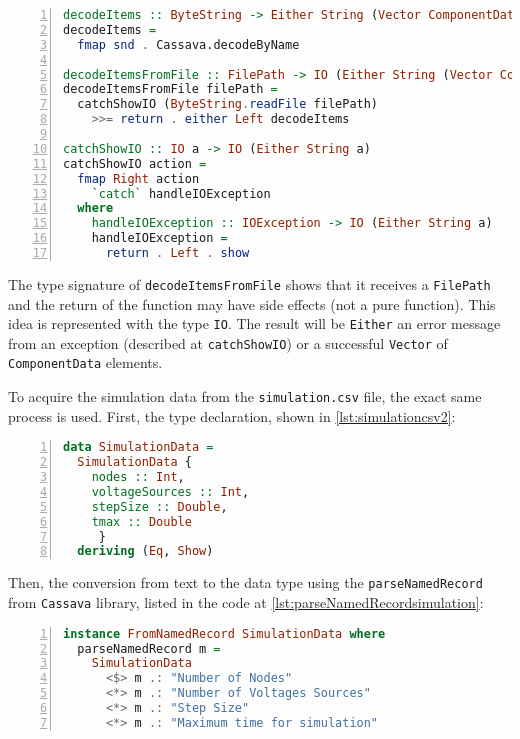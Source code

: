 \begin{lstlisting}[language=Haskell, numbers=left, caption={Decoding a CSV file}, captionpos=b, label={lst:decode}]
decodeItems :: ByteString -> Either String (Vector ComponentData)
decodeItems =
  fmap snd . Cassava.decodeByName

decodeItemsFromFile :: FilePath -> IO (Either String (Vector ComponentData))
decodeItemsFromFile filePath =
  catchShowIO (ByteString.readFile filePath)
    >>= return . either Left decodeItems

catchShowIO :: IO a -> IO (Either String a)
catchShowIO action =
  fmap Right action
    `catch` handleIOException
  where
    handleIOException :: IOException -> IO (Either String a)
    handleIOException =
      return . Left . show

\end{lstlisting}

The type signature of \lstinline!decodeItemsFromFile! shows that it receives a \lstinline!FilePath! and the return of the function may have side effects (not a pure function). This idea is represented with the type \lstinline!IO!. The result will be \lstinline!Either! an error message from an exception (described at \lstinline!catchShowIO!) or a successful \lstinline!Vector! of \lstinline!ComponentData! elements.

To acquire the simulation data from the \lstinline!simulation.csv! file, the exact same process is used. First, the type declaration, shown in \cref{lst:simulationcsv2}:

\begin{lstlisting}[language=Haskell, numbers=left, caption={SimulationData declaration}, captionpos=b, label={lst:simulationcsv2}]
data SimulationData = 
  SimulationData { 
    nodes :: Int,
    voltageSources :: Int,
    stepSize :: Double,
    tmax :: Double
     }
  deriving (Eq, Show)
\end{lstlisting}

Then, the conversion from text to the data type using the \lstinline!parseNamedRecord! from \lstinline!Cassava! library, listed in the code at \cref{lst:parseNamedRecordsimulation}:

\begin{lstlisting}[language=Haskell, numbers=left, caption={parseNamedRecord for simulation data}, captionpos=b, label={lst:parseNamedRecordsimulation}]
instance FromNamedRecord SimulationData where
  parseNamedRecord m =
    SimulationData
      <$> m .: "Number of Nodes"
      <*> m .: "Number of Voltages Sources"
      <*> m .: "Step Size"
      <*> m .: "Maximum time for simulation"
\end{lstlisting}

